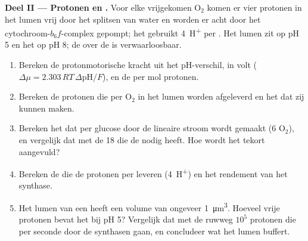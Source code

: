 \begin{problem}
\medskip
\noindent\textbf{Deel II --- Protonen en .}
Voor elke vrijgekomen $\mathrm{O_2}$ komen er vier protonen in het lumen vrij door
het splitsen van water en worden er acht door het cytochroom-$b_6f$-complex
gepompt; het  gebruikt \qty{4}{H^+} per . Het lumen zit op pH 5 en
het  op pH 8; de  over de  is verwaarloosbaar.
\begin{enumerate}[resume]
  \item Bereken de protonmotorische kracht uit het pH-verschil, in volt
        ($\Delta\mu = 2.303\,RT\,\Delta\mathrm{pH}/F$), en de 
        per mol protonen.
  \item Bereken de protonen die per $\mathrm{O_2}$ in het lumen worden
        afgeleverd en het  dat zij kunnen maken.
  \item Bereken het  dat per glucose door de lineaire stroom wordt
        gemaakt (6 $\mathrm{O_2}$), en vergelijk dat met de 18 die de
         nodig heeft. Hoe wordt het tekort aangevuld?
  \item Bereken de  die de protonen per  leveren
        (\qty{4}{H^+}) en het rendement van het synthase.
  \item Het lumen van een  heeft een volume van ongeveer
        \qty{1}{\micro m^3}. Hoeveel vrije protonen bevat het bij pH 5?
        Vergelijk dat met de ruwweg $10^5$ protonen die per seconde door de
        synthasen gaan, en concludeer wat het lumen buffert.
\end{enumerate}


\end{problem}
